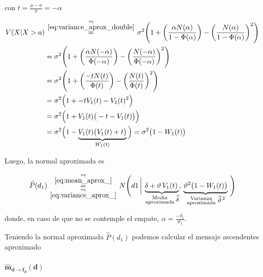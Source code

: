 \documentclass[article]{jss}
\newcommand\hfrac[2]{\genfrac{}{}{0pt}{}{#1}{#2}} %
\begin{document}
\begin{appendix}
con $t = \frac{\mu -a}{\sigma} = -\alpha  $

\begin{equation}\label{eq:variance_aprox_}
\begin{split}
 V(X|  X > a) & \overset{\hfrac{\text{eq}}{\ref{eq:variance_aprox_double}}}{=} \sigma^2 \Bigg( 1 + \bigg(\frac{\alpha N(\alpha)}{1 - \Phi(\alpha) }\bigg) - \bigg(\frac{N(\alpha)}{1 - \Phi(\alpha) }\bigg)^2 \Bigg) \\
 & = \sigma^2 \Bigg( 1 + \bigg(\frac{\alpha N(-\alpha)}{\Phi(-\alpha) }\bigg) - \bigg(\frac{N(-\alpha)}{\Phi(-\alpha) }\bigg)^2 \Bigg) \\
 & = \sigma^2 \Bigg( 1 + \bigg(\frac{-t N(t)}{\Phi(t) }\bigg) - \bigg(\frac{N(t)}{\Phi(t) }\bigg)^2 \Bigg) \\
 & = \sigma^2 \Big( 1 +  -t V_1(t) - V_1(t)^2 \Big) \\
 & = \sigma^2 \Big( 1 + V_1(t) \big(-t  - V_1(t)\big) \Big)  \\
 & = \sigma^2 \Big( 1 - \underbrace{V_1(t) \big(V_1(t) + t \big)}_{W_1(t)} \Big)  = \sigma^2 \big( 1 - W_1(t) \big)
 \end{split}
\end{equation}

Luego, la normal aproximada es

\begin{equation}\label{eq:p*_d}
 \widehat{P}(d_1) \overset{\hfrac{\text{eq}}{\ref{eq:mean_aprox_}}}{\underset{\hfrac{\text{eq}}{\ref{eq:variance_aprox_}}}{=}} N\Bigg(d1 \,  \bigg| \, \underbrace{ \delta + \vartheta \, V_1(t) \,}_{\hfrac{\text{\scriptsize Media}}{\text{\scriptsize aproximada}} \, \text{\small $\widehat{\delta}$}} , \,  \underbrace{ \vartheta^2 \big( 1 - W_1(t) \big) }_{\hfrac{\text{\scriptsize Varianza}}{\text{\scriptsize aproximada}} \,\text{\small $\widehat{\vartheta}^{\,2}$}} \, \Bigg)
\end{equation}

donde, en caso de que no se contemple el empate, $\alpha=\frac{-\delta_1}{\vartheta_1}$.

Teniendo la normal aproximada $\widehat{P}(d_1)$ podemos calcular el mensaje ascendentes aproximado

\paragraph{$\bm{\widehat{m}_{d \rightarrow f_{d}}(d)}$}


\end{appendix}
\end{document}

